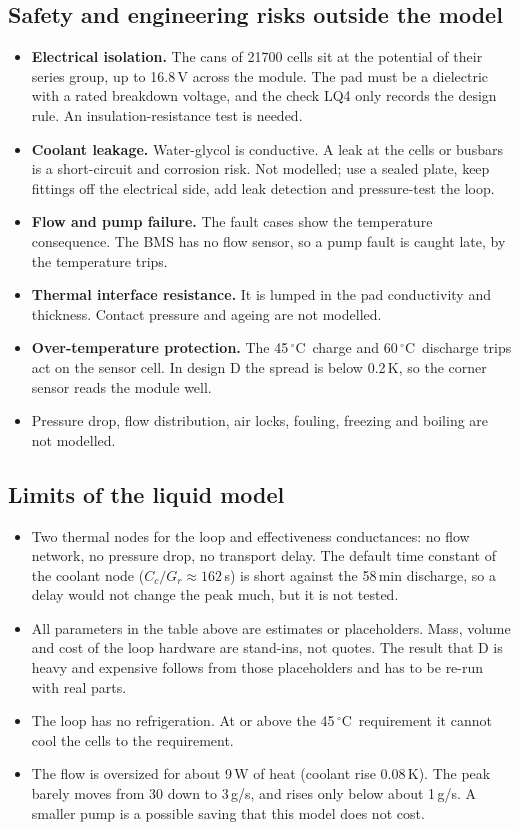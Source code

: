 \documentclass[11pt,a4paper]{article}
\newcommand{\degC}{\ensuremath{{}^{\circ}\mathrm{C}}}
\begin{document}
\subsection{Safety and engineering risks outside the model}
\begin{itemize}
\item \textbf{Electrical isolation.} The cans of 21700 cells sit at the potential of their series group, up to 16.8\,V across the module. The pad must be a dielectric with a rated breakdown voltage, and the check LQ4 only records the design rule. An insulation-resistance test is needed.
\item \textbf{Coolant leakage.} Water-glycol is conductive. A leak at the cells or busbars is a short-circuit and corrosion risk. Not modelled; use a sealed plate, keep fittings off the electrical side, add leak detection and pressure-test the loop.
\item \textbf{Flow and pump failure.} The fault cases show the temperature consequence. The BMS has no flow sensor, so a pump fault is caught late, by the temperature trips.
\item \textbf{Thermal interface resistance.} It is lumped in the pad conductivity and thickness. Contact pressure and ageing are not modelled.
\item \textbf{Over-temperature protection.} The 45\,\degC\ charge and 60\,\degC\ discharge trips act on the sensor cell. In design D the spread is below 0.2\,K, so the corner sensor reads the module well.
\item Pressure drop, flow distribution, air locks, fouling, freezing and boiling are not modelled.
\end{itemize}

\subsection{Limits of the liquid model}
\begin{itemize}
\item Two thermal nodes for the loop and effectiveness conductances: no flow network, no pressure drop, no transport delay. The default time constant of the coolant node ($C_c/G_r\approx 162$\,s) is short against the 58\,min discharge, so a delay would not change the peak much, but it is not tested.
\item All parameters in the table above are estimates or placeholders. Mass, volume and cost of the loop hardware are stand-ins, not quotes. The result that D is heavy and expensive follows from those placeholders and has to be re-run with real parts.
\item The loop has no refrigeration. At or above the 45\,\degC\ requirement it cannot cool the cells to the requirement.
\item The flow is oversized for about 9\,W of heat (coolant rise 0.08\,K). The peak barely moves from 30 down to 3\,g/s, and rises only below about 1\,g/s. A smaller pump is a possible saving that this model does not cost.
\end{itemize}
\end{document}

